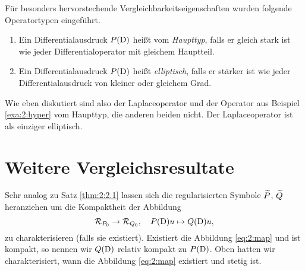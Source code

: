 Für besonders hervorstechende Vergleichbarkeitseigenschaften
wurden folgende Operatortypen eingeführt.

\begin{df}
\begin{enumerate}
\item
Ein Differentialausdruck $P(\mathrm D)$ heißt vom {\em Haupttyp},
falls er gleich stark ist wie jeder Differentialoperator mit gleichem Hauptteil.
\item
Ein Differentialausdruck $P(\mathrm D)$ heißt {\em elliptisch},
falls er stärker ist wie jeder Differentialausdruck von kleiner oder gleichem Grad.
\end{enumerate}
\end{df}

Wie eben diskutiert sind also der Laplaceoperator
und der Operator aus Beispiel \ref{exa:2:hyper} vom Haupttyp,
die anderen beiden nicht.
Der Laplaceoperator ist als einziger elliptisch.

\section{Weitere Vergleichsresultate}

Sehr analog zu Satz \ref{thm:2:2.1} lassen sich die regularisierten
Symbole $\widetilde{P}$, $\widetilde{Q}$ heranziehen
um die Kompaktheit der Abbildung
\begin{equation}\label{eq:2:map}
\mathcal R_{P_0}\to\mathcal R_{Q_0},\quad P(\mathrm D)u\mapsto Q(\mathrm D)u,
\end{equation}
zu charakterisieren (falls sie existiert).
Existiert die Abbildung \eqref{eq:2:map} und ist kompakt,
so nennen wir $Q(\mathrm D)$ relativ kompakt zu $P(\mathrm D)$.
Oben hatten wir charakterisiert,
wann die Abbildung \eqref{eq:2:map} existiert und stetig ist.

